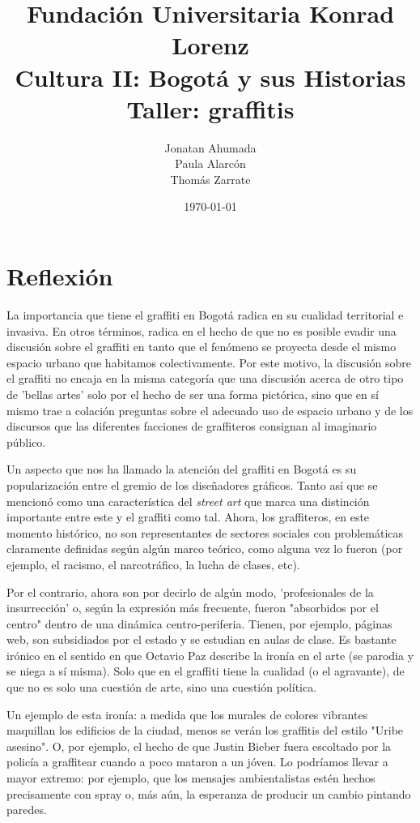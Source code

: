 \documentclass[11pt]{article}
\author{Jonatan Ahumada\\
Paula Alarcón\\
Thomás Zarrate
}
\date{\today}
\title{Fundación Universitaria Konrad Lorenz \\
Cultura II: Bogotá y sus Historias\\
Taller: graffitis}
\begin{document}
\maketitle
\section{Reflexión}
\label{sec-2}
La importancia que tiene el graffiti en Bogotá radica en su cualidad territorial e invasiva. En otros términos, radica en 
el hecho de que no es posible evadir una discusión sobre el graffiti
en tanto que el fenómeno se proyecta desde el mismo espacio urbano
que habitamos colectivamente. Por este motivo, la discusión 
sobre el graffiti no encaja en la misma categoría que una discusión 
acerca de otro tipo de 'bellas artes' solo por el hecho de ser 
una forma pictórica, sino que en sí mismo trae a colación preguntas
sobre el adecuado uso de espacio urbano y de los discursos que las 
diferentes facciones de graffiteros consignan al imaginario público.

Un aspecto que nos ha llamado la atención del graffiti en Bogotá es 
su popularización entre el gremio de los diseñadores gráficos. Tanto 
así que se mencionó como una característica del \emph{street art} que marca
una distinción importante entre este y el graffiti como tal. Ahora,
los graffiteros, en este momento histórico, no son representantes de sectores sociales con
problemáticas claramente definidas según algún marco teórico, como alguna vez lo fueron (por ejemplo, el
racismo, el narcotráfico, la lucha de clases, etc). 

Por el contrario, ahora son por
decirlo de algún modo, 'profesionales de la insurrección' o, según la expresión más frecuente, fueron
"absorbidos por el centro" dentro de una dinámica centro-periferia. Tienen, 
por ejemplo, páginas web, son subsidiados por el estado y se estudian 
en aulas de clase. Es bastante irónico en el sentido en que Octavio 
Paz describe la ironía en el arte (se parodia y se niega a sí misma). Solo que en el graffiti tiene la
cualidad (o el agravante), de que no es solo una cuestión de arte, 
sino una cuestión política. 

Un ejemplo de esta ironía:  a medida que los murales de colores vibrantes maquillan los edificios
de la ciudad, menos se verán los graffitis del estilo "Uribe
asesino". O, por ejemplo, el hecho de que Justin Bieber fuera escoltado
por la policía a graffitear cuando a poco mataron a un jóven. Lo podríamos llevar a mayor extremo:
por ejemplo, que los mensajes ambientalistas estén hechos precisamente con spray o, más aún,
la esperanza de producir un cambio pintando paredes.  	
\end{document}
